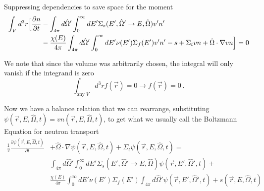 \documentclass[12pt]{article}
\newlength{\up}
\newcommand{\vOmega}{\ensuremath{\hat{\Omega}}}
\begin{document}
Suppressing dependencies to save space for the moment
%
\begin{align}
\int_V d^3r \Bigl[\frac{\partial n}{\partial t} &- 
\int_{4\pi} d\vOmega' \int_0^{\infty} dE' \Sigma_s(E', \vOmega' \rightarrow E, \vOmega) v' n' \nonumber\\&-
\frac{\chi(E)}{4\pi} \int_{4\pi} d\vOmega' \int_0^{\infty} dE' \nu(E') \Sigma_f(E') v' n' -
s +
\Sigma_t v n + 
\vOmega \cdot \nabla v n \Bigr] = 0 \nonumber
\end{align}

We note that since the volume was arbitrarily chosen, the integral will only vanish if the integrand is zero 
\[\int_{\text{any }V} d^3r f(\vec{r}) = 0 \rightarrow f(\vec{r}) = 0 \:.\]

Now we have a balance relation that we can rearrange, substituting $\psi(\vec{r}, E, \vOmega, t) = vn(\vec{r}, E, \vOmega, t)$, to get what we usually call the Boltzmann Equation for neutron transport
%
\begin{align}
\frac{1}{v}\frac{\partial \psi(\vec{r}, E, \vOmega, t)}{\partial t} &+ 
\vOmega \cdot \nabla \psi(\vec{r}, E, \vOmega, t) +
\Sigma_t \psi(\vec{r}, E, \vOmega, t) = \nonumber\\
%
& \int_{4\pi} d\vOmega' \int_0^{\infty} dE' \Sigma_s(E', \vOmega' \rightarrow E, \vOmega) \psi(\vec{r}, E', \vOmega', t)  +\nonumber\\
%
& \frac{\chi(E)}{4\pi} \int_0^{\infty} dE' \nu(E') \Sigma_f(E') \int_{4\pi} d\vOmega' \psi(\vec{r}, E', \vOmega', t) +
s(\vec{r}, E, \vOmega, t) \nonumber
\end{align}

\end{document}
